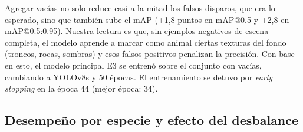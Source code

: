 Agregar vacías no solo reduce casi a la mitad los falsos disparos, que era lo
esperado, sino que también sube el mAP (+1,8 puntos en mAP@0.5 y +2,8 en
mAP@0.5:0.95). Nuestra lectura es que, sin ejemplos negativos de escena
completa, el modelo aprende a marcar como animal ciertas texturas del fondo
(troncos, rocas, sombras) y esos falsos positivos penalizan la precisión. Con
base en esto, el modelo principal E3 se entrenó sobre el conjunto con vacías,
cambiando a YOLOv8s y 50 épocas. El entrenamiento se detuvo por
\emph{early stopping} en la época 44 (mejor época: 34).

\subsection{Desempeño por especie y efecto del desbalance}

